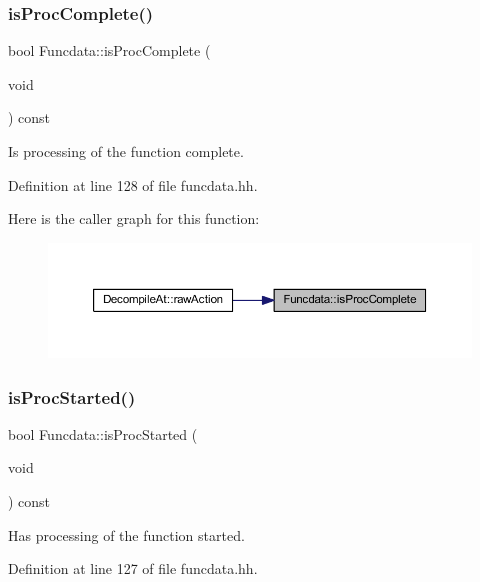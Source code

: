 \subsubsection{\texorpdfstring{isProcComplete()}{isProcComplete()}}
{\footnotesize\ttfamily bool Funcdata\+::is\+Proc\+Complete (\begin{DoxyParamCaption}\item[{void}]{ }\end{DoxyParamCaption}) const\hspace{0.3cm}{\ttfamily [inline]}}



Is processing of the function complete. 



Definition at line 128 of file funcdata.\+hh.

Here is the caller graph for this function\+:
\nopagebreak
\begin{figure}[H]
\begin{center}
\leavevmode
\includegraphics[width=350pt]{class_funcdata_ac67b670f722fcb5aa113746f972ab1b7_icgraph}
\end{center}
\end{figure}
\mbox{\label{class_funcdata_aecb26084299205063c0a3d37ddfcc54f}} 
\subsubsection{\texorpdfstring{isProcStarted()}{isProcStarted()}}
{\footnotesize\ttfamily bool Funcdata\+::is\+Proc\+Started (\begin{DoxyParamCaption}\item[{void}]{ }\end{DoxyParamCaption}) const\hspace{0.3cm}{\ttfamily [inline]}}



Has processing of the function started. 



Definition at line 127 of file funcdata.\+hh.

